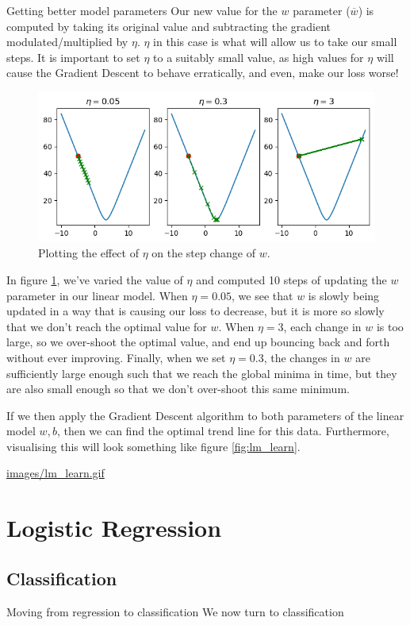\documentclass[10pt]{beamer}
\begin{document}
\begin{frame}[fragile,allowframebreaks,label=]{Getting better model parameters}
Our new value for the \(w\) parameter (\(\overline{w}\)) is computed by taking its
original value and subtracting the gradient modulated/multiplied by \(\eta\). \(\eta\) in
this case is what will allow us to take our \alert{small steps}. It is important to set
\(\eta\) to a suitably small value, as high values for \(\eta\) will cause the Gradient
Descent to behave erratically, and even, make our loss worse!

\begin{figure}[htbp]
\centering
\includegraphics[width=.9\linewidth]{images/small_step_eta.png}
\caption{\label{fig:eta}Plotting the effect of \(\eta\) on the step change of \(w\).}
\end{figure}

In figure \ref{fig:eta}, we've varied the value of \(\eta\) and computed 10 steps of updating
the \(w\) parameter in our linear model. When \(\eta=0.05\), we see that \(w\) is slowly
being updated in a way that is causing our loss to decrease, but it is more so slowly
that we don't reach the optimal value for \(w\). When \(\eta=3\), each change in \(w\) is
too large, so we over-shoot the optimal value, and end up bouncing back and forth
without ever improving. Finally, when we set \(\eta=0.3\), the changes in \(w\) are
sufficiently large enough such that we reach the \alert{global minima} in time, but they are
also small enough so that we don't over-shoot this same minimum.

If we then apply the Gradient Descent algorithm to both parameters of the linear
model \(w, b\), then we can find the optimal trend line for this data. Furthermore,
visualising this will look something like figure \ref{fig:lm_learn}.

\url{images/lm\_learn.gif}
\end{frame}

\section*{Logistic Regression}
\label{sec:org3719b3c}

\subsection*{Classification}
\label{sec:org1c4aabc}

\begin{frame}[label={sec:orge0fd7f1}]{Moving from regression to classification}
We now turn to classification
\end{frame}
\end{document}
